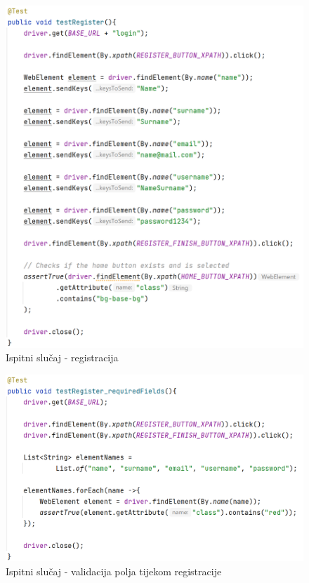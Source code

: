                 \begin{figure}[H]
        		\includegraphics[scale=1]{slike/integration_test_register.png} 
        		  \centering
        		\caption{Ispitni slučaj - registracija}
        	\end{figure}

                \begin{figure}[H]
        		\includegraphics[scale=1]{slike/integration_test_register_required_fields.png} 
        		  \centering
        		\caption{Ispitni slučaj - validacija polja tijekom registracije}
        	\end{figure}
   
